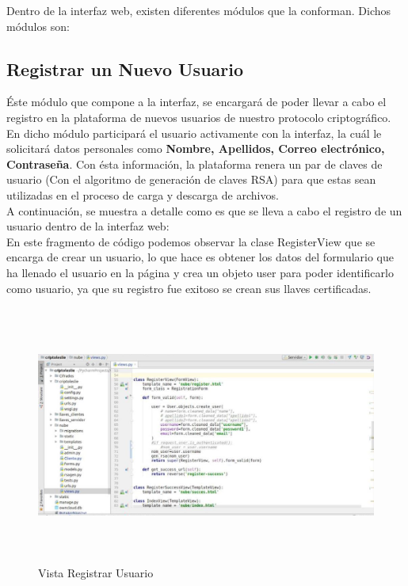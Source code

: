 Dentro de la interfaz web, existen diferentes módulos que la conforman. Dichos módulos son: 


\subsection{Registrar un Nuevo Usuario} 
Éste módulo que compone a la interfaz, se encargará de poder llevar a cabo el registro en la plataforma de nuevos usuarios de nuestro protocolo criptográfico. En dicho módulo participará el usuario activamente con la interfaz, la cuál le solicitará datos personales como \textbf{Nombre, Apellidos, Correo electrónico, Contraseña}. Con ésta información, la plataforma renera un par de claves de usuario (Con el algoritmo de generación de claves RSA) para que estas sean utilizadas en el proceso de carga y descarga de archivos. \\ 

A continuación, se muestra a detalle como es que se lleva a cabo el registro de un usuario dentro de la interfaz web: \\ 

En este fragmento de código podemos observar la clase RegisterView que se encarga de crear un usuario, lo que hace es obtener los datos del formulario que ha llenado el usuario en la página y crea un objeto user para poder identificarlo como usuario, ya que su registro fue exitoso se crean sus llaves certificadas.

			\begin{figure}[H]
			\centering
			\includegraphics[width=15cm, height=8.5cm]{./images/Interfaz/01.jpg}
			\caption{Vista Registrar Usuario}
			\label{fig:6-4-1} 
			\end{figure} 

